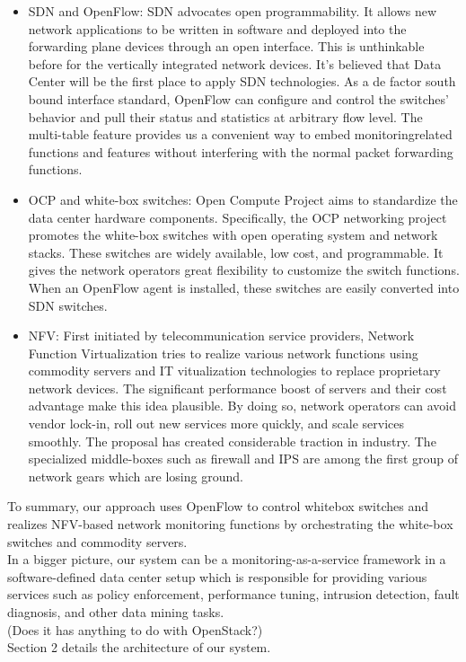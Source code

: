 \documentclass{acm_proc_article-sp}
\begin{document}
\begin{itemize}
\item SDN and OpenFlow\cite{openflow}: SDN advocates open programmability. It allows new network applications to be written in software and deployed into the forwarding plane devices through an open interface. This is unthinkable before for the vertically integrated network devices. It’s believed that Data Center will be the first place to apply SDN technologies. As a de factor south bound interface standard, OpenFlow can configure and control the switches’ behavior and pull their status and statistics at arbitrary flow level. The multi-table feature provides us a convenient way to embed monitoringrelated functions and features without interfering with the normal packet forwarding functions.
\item OCP and white-box switches\cite{ocp}: Open Compute Project aims to standardize the data center hardware components. Specifically, the OCP networking project promotes the white-box switches with open operating system and network stacks. These switches are widely available, low cost, and programmable. It gives the network operators great flexibility to customize the switch functions. When an OpenFlow agent is installed, these switches are easily converted into SDN switches.
\item NFV\cite{nfv}: First initiated by telecommunication service providers, Network Function Virtualization tries to realize various network functions using commodity servers and IT vitualization technologies to replace proprietary network devices. The significant performance boost of servers and their cost advantage make this idea plausible. By doing so, network operators can avoid vendor lock-in, roll out new services more quickly, and scale services smoothly. The proposal has created considerable traction in industry. The specialized middle-boxes such as firewall and IPS are among the first group of network gears which are losing ground.
\end{itemize}
To summary, our approach uses OpenFlow to control whitebox switches and realizes NFV-based network monitoring functions by orchestrating the white-box switches and commodity servers.\\
In a bigger picture, our system can be a monitoring-as-a-service framework in a software-defined data center\cite{sddc} setup which is responsible for providing various services such as policy enforcement, performance tuning, intrusion detection, fault diagnosis, and other data mining tasks.\\
(Does it has anything to do with OpenStack?)\\
Section 2 details the architecture of our system.\\
\end{document}
